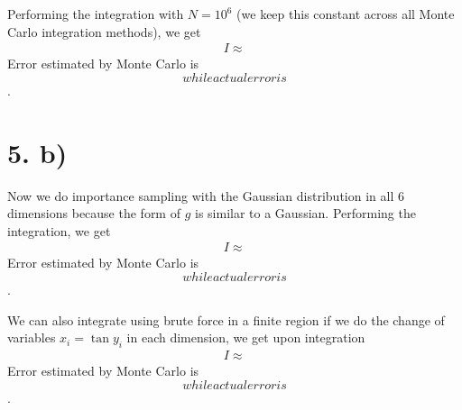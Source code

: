 \documentclass{article}
\begin{document}
Performing the integration with $N = 10^6$ (we keep this constant across all Monte Carlo integration methods), we get
\begin{align*}
    I \approx 
\end{align*}
Error estimated by Monte Carlo is $$ while actual error is $$.

\section*{5. b)}

Now we do importance sampling with the Gaussian distribution in all 6 dimensions because the form of $g$ is similar to a Gaussian.
Performing the integration, we get
\begin{align*}
    I \approx 
\end{align*}
Error estimated by Monte Carlo is $$ while actual error is $$.

We can also integrate using brute force in a finite region if we do the change of variables $x_i = \tan y_i$ in each dimension,
we get upon integration
\begin{align*}
    I \approx 
\end{align*}
Error estimated by Monte Carlo is $$ while actual error is $$.
\end{document}
